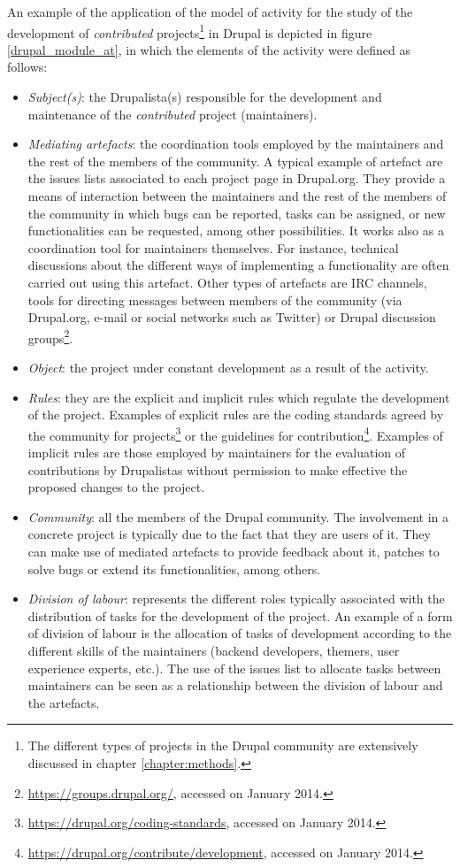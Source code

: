 An example of the application of the model of activity for the study of the development of \textit{contributed} projects\footnote{The different types of projects in the Drupal community are extensively discussed in chapter \ref{chapter:methods}.} in Drupal is depicted in figure \ref{drupal_module_at}, in which the elements of the activity were defined as follows:

\begin{itemize}
	\item \textit{Subject(s)}: the Drupalista(s) responsible for the development and maintenance of the \textit{contributed} project (maintainers).
	\item \textit{Mediating artefacts}: the coordination tools employed by the maintainers and the rest of the members of the community. A typical example of artefact are the issues lists associated to each project page in Drupal.org. They provide a means of interaction between the maintainers and the rest of the members of the community in which bugs can be reported, tasks can be assigned, or new functionalities can be requested, among other possibilities. It works also as a coordination tool for maintainers themselves. For instance, technical discussions about the different ways of implementing a functionality are often carried out using this artefact. Other types of artefacts are IRC channels, tools for directing messages between members of the community (via Drupal.org, e-mail or social networks such as Twitter) or Drupal discussion groups\footnote{\url{https://groups.drupal.org/}, accessed on  January 2014.}.
	\item \textit{Object}: the project under constant development as a result of the activity.
	\item \textit{Rules}: they are the explicit and implicit rules which regulate the development of the project. Examples of explicit rules are the coding standards agreed by the community for projects\footnote{\url{https://drupal.org/coding-standards}, accessed on  January 2014.} or the guidelines for contribution\footnote{\url{https://drupal.org/contribute/development}, accessed on  January 2014.}. 	Examples of implicit rules are those employed by maintainers for the evaluation of contributions by Drupalistas without permission to make effective the proposed changes to the project.
	\item \textit{Community}: all the members of the Drupal community. The involvement in a concrete project is typically due to the fact that they are users of it. They can make use of mediated artefacts to provide feedback about it, patches to solve bugs or extend its functionalities, among others. 
	\item \textit{Division of labour}: represents the different roles typically associated with the distribution of tasks for the development of the project. An example of a form of division of labour is the allocation of tasks of development according to the different skills of the maintainers (backend developers, themers, user experience experts, etc.). The use of the issues list to allocate tasks between maintainers can be seen as a relationship between the division of labour and the artefacts.
\end{itemize}


